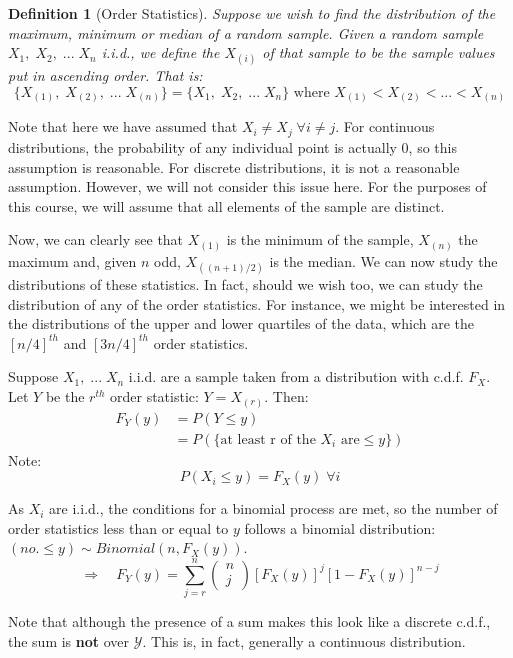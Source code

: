 \documentclass[12pt,a4paper]{article}
\newtheorem{defn}[thm]{Definition}
\newcommand{\uline}[1]{\underline{\smash{#1}}}
\begin{document}
\begin{defn}[Order Statistics]\vspace{1cm}

Suppose we wish to find the distribution of the maximum, minimum or median of a random sample. Given a random sample $X_1,\; X_2,\; ...\; X_n$ i.i.d., we define the \uline{order statistics} $X_{(i)}$ of that sample to be the sample values put in ascending order. That is:
$$\{X_{(1)},\; X_{(2)},\; ...\; X_{(n)}\} = \{X_1,\; X_2,\; ...\; X_n\} \text{ where } X_{(1)}<X_{(2)}< ... < X_{(n)}$$
\end{defn}

Note that here we have assumed that $X_i \neq X_j \; \forall i \neq j$. For continuous distributions, the probability of any individual point is actually 0, so this assumption is reasonable. For discrete distributions, it is not a reasonable assumption. However, we will not consider this issue here. For the purposes of this course, we will assume that all elements of the sample are distinct.

Now, we can clearly see that $X_{(1)}$ is the minimum of the sample, $X_{(n)}$ the maximum and, given $n$ odd, $X_{((n+1)/2)}$ is the median. We can now study the distributions of these statistics. In fact, should we wish too, we can study the distribution of any of the order statistics. For instance, we might be interested in the distributions of the upper and lower quartiles of the data, which are the $[n/4]^{th}$ and $[3n/4]^{th}$ order statistics.

Suppose $X_1,\; ...\; X_n$ i.i.d. are a sample taken from a distribution with c.d.f. $F_X$. Let $Y$ be the $r^{th}$ order statistic: $Y=X_{(r)}$. Then:
\begin{align*}
F_Y(y) &= P(Y\leq y)\\
&= P(\{\text{at least r of the $X_i$ are} \leq y\})
\end{align*}
Note:
$$P(X_i \leq y) = F_X(y)\; \forall i$$

As $X_i$ are i.i.d., the conditions for a binomial process are met, so the number of order statistics less than or equal to $y$ follows a binomial distribution: $(no. \leq y) \sim Binomial(n, F_X(y))$.
$$\Rightarrow \quad F_Y(y) = \sum_{j=r}^n \left(\!\!\!\begin{array}{c} n\\j\end{array}\!\!\!\right) [F_X(y)]^j [1-F_X(y)]^{n-j}$$

Note that although the presence of a sum makes this look like a discrete c.d.f., the sum is \textbf{not} over $\mathcal{Y}$. This is, in fact, generally a continuous distribution.
\end{document}
